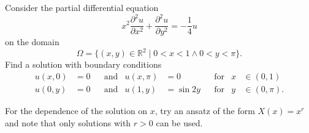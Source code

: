 Consider the partial differential equation
\begin{equation}
x^2 \frac{\partial^2 u}{\partial x^2}
+
\frac{\partial^2 u}{\partial y^2}
=
-\frac14
u
\label{40000022:eqn}
\end{equation}
on the domain 
\[
\Omega
=
\{
(x,y)\in\mathbb R^2
\;|\;
0<x<1\wedge 0<y<\pi
\}.
\]
Find a solution with boundary conditions
\[
\begin{aligned}
u(x,0) &= 0 &&\text{and}& u(x,\pi) &= 0 &&\text{for} &x&\in(0,1)
\\
u(0,y) &= 0 &&\text{and}& u(1,y) &=\sin 2y &&\text{for} &y&\in(0,\pi).
\end{aligned}
\]

\begin{hinweis}
For the dependence of the solution on $x$, try an ansatz of the form
$X(x)=x^r$
and note that only solutions with $r>0$ can be used.
\end{hinweis}

